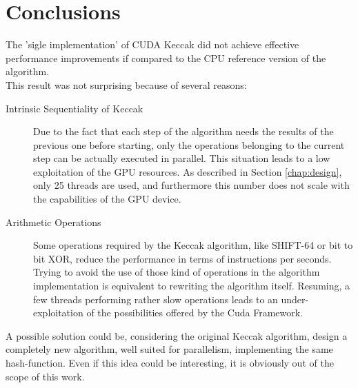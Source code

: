 \chapter{Conclusions}
The 'sigle implementation' of CUDA Keccak did not achieve effective performance improvements if compared to the CPU reference version of the algorithm.\\
This result was not surprising because of several reasons:
\begin{description}
\item [Intrinsic Sequentiality of Keccak] Due to the fact that each step of the algorithm needs the results of the previous one before starting, only the operations belonging to the current step can be actually executed in parallel. This situation leads to a low exploitation of the GPU resources. As described in Section \ref{chap:design}, only 25 threads are used, and furthermore this number does not scale with the capabilities of the GPU device.
\item [Arithmetic Operations] Some operations required by the Keccak algorithm, like SHIFT-64 or bit to bit XOR, reduce the performance in terms of instructions per seconds. Trying to avoid the use of those kind of operations in the algorithm implementation is equivalent to rewriting the algorithm itself. Resuming, a few threads performing rather slow operations leads to an under-exploitation of the possibilities offered by the Cuda Framework.
\end{description}
A possible solution could be, considering the original Keccak algorithm, design a completely new algorithm, well suited for parallelism, implementing the same hash-function. Even if this idea could be interesting, it is obviously out of the scope of this work.

